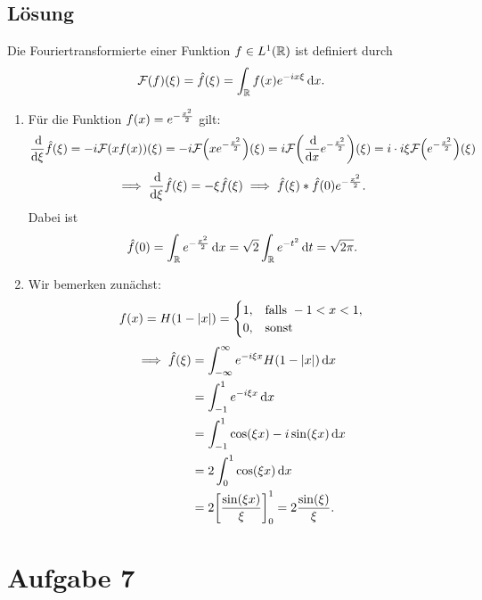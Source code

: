 \documentclass{exercise}
\begin{document}
    \subsection*{Lösung}
    Die Fouriertransformierte einer Funktion \(f \in L^1\parentheses*{\R}\) ist definiert durch
    \[
        \mathcal{F}\parentheses*{f}\parentheses*{\xi} = \hat{f}\parentheses*{\xi} = \int_\R f\parentheses*{x}e^{-ix\xi}\d x.
    \]
    \begin{enumerate}
        \item Für die Funktion \(f\parentheses*{x} = e^{-\frac{x^2}{2}}\) gilt:
        \[
            \frac{\d}{\d\xi}\hat{f}\parentheses*{\xi} = -i\mathcal{F}\parentheses*{xf\parentheses*{x}}\parentheses*{\xi} = -i\mathcal{F}\parentheses*{xe^{-\frac{x^2}{2}}}\parentheses*{\xi} = i\mathcal{F}\parentheses*{\frac{\d}{\d x}e^{-\frac{x^2}{2}}}\parentheses*{\xi} = i \cdot i\xi\mathcal{F}\parentheses*{e^{-\frac{x^2}{2}}}\parentheses*{\xi}
        \]
        \[
            \implies \frac{\d}{\d\xi}\hat{f}\parentheses*{\xi} = -\xi\hat{f}\parentheses*{\xi} \implies \hat{f}\parentheses*{\xi} * \hat{f}\parentheses*{0}e^{-\frac{x^2}{2}}.
        \]
        Dabei ist
        \[
            \hat{f}\parentheses*{0} = \int_\R e^{-\frac{x^2}{2}}\d x = \sqrt{2}\int_\R e^{-t^2}\d t = \sqrt{2\pi}.
        \]
        \item Wir bemerken zunächst:
        \[
            f\parentheses*{x} = H\parentheses*{1 - \absolute*{x}} = \begin{cases}
                1, & \text{falls }-1 < x < 1,\\
                0, & \text{sonst}
            \end{cases}
        \]
        \begin{align*}
            \implies \hat{f}\parentheses*{\xi} &= \int_{-\infty}^\infty e^{-i\xi x}H\parentheses*{1 - \absolute*{x}}\d x\\
            &= \int_{-1}^1 e^{-i\xi x}\d x\\
            &= \int_{-1}^1 \cos\parentheses*{\xi x} - i\sin\parentheses*{\xi x}\d x\\
            &= 2\int_0^1 \cos\parentheses*{\xi x}\d x\\
            &= 2\brackets*{\frac{\sin\parentheses*{\xi x}}{\xi}}_0^1 = 2\frac{\sin\parentheses*{\xi}}{\xi}.
        \end{align*}
    \end{enumerate}


    \section*{Aufgabe 7}
    
\end{document}
